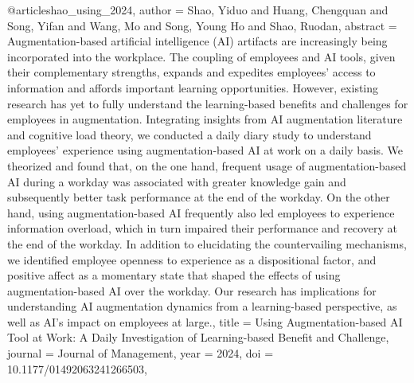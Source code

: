 @article{shao_using_2024,
  author = {Shao, Yiduo and Huang, Chengquan and Song, Yifan and Wang, Mo and Song, Young Ho and Shao, Ruodan},
  abstract = {Augmentation-based artificial intelligence (AI) artifacts are increasingly being incorporated into the workplace. The coupling of employees and AI tools, given their complementary strengths, expands and expedites employees’ access to information and affords important learning opportunities. However, existing research has yet to fully understand the learning-based benefits and challenges for employees in augmentation. Integrating insights from AI augmentation literature and cognitive load theory, we conducted a daily diary study to understand employees’ experience using augmentation-based AI at work on a daily basis. We theorized and found that, on the one hand, frequent usage of augmentation-based AI during a workday was associated with greater knowledge gain and subsequently better task performance at the end of the workday. On the other hand, using augmentation-based AI frequently also led employees to experience information overload, which in turn impaired their performance and recovery at the end of the workday. In addition to elucidating the countervailing mechanisms, we identified employee openness to experience as a dispositional factor, and positive affect as a momentary state that shaped the effects of using augmentation-based AI over the workday. Our research has implications for understanding AI augmentation dynamics from a learning-based perspective, as well as AI’s impact on employees at large.},
  title = {{Using} {Augmentation-based} {AI} {Tool} {at} {Work}: {A} {Daily} {Investigation} {of} {Learning-based} {Benefit} {and} {Challenge}},
  journal = {Journal of Management},
  year = {2024},
  doi = {10.1177/01492063241266503},
}


